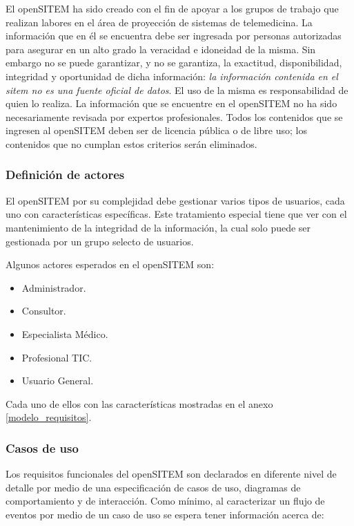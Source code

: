 El openSITEM ha sido creado con el fin de apoyar a los grupos de trabajo que realizan labores en el área de proyección de sistemas de telemedicina. La información que en él se encuentra debe ser ingresada por personas autorizadas para asegurar en un alto grado la veracidad e idoneidad de la misma. Sin embargo no se puede garantizar, y no se garantiza, la exactitud, disponibilidad, integridad y oportunidad de dicha información: \textit{la información contenida en el sitem no es una fuente oficial de datos}. El uso de la misma es responsabilidad de quien lo realiza. La información que se encuentre en el openSITEM no ha sido necesariamente revisada por expertos profesionales. Todos los contenidos que se ingresen al openSITEM deben ser de licencia pública o de libre uso; los contenidos que no cumplan estos criterios serán eliminados.

\subsubsection{Definición de actores}

El openSITEM por su complejidad debe gestionar varios tipos de usuarios, cada uno con características específicas. Este tratamiento especial tiene que ver con el mantenimiento de la integridad de la información, la cual solo puede ser gestionada por un grupo selecto de usuarios. 

Algunos actores esperados en el openSITEM son:

\begin{itemize}
\item Administrador.
\item Consultor.
\item Especialista Médico.
\item Profesional TIC.
\item Usuario General.
\end{itemize}

Cada uno de ellos con las características mostradas en el anexo \ref{modelo_requisitos}.

\subsubsection{Casos de uso}

Los requisitos funcionales del openSITEM son declarados en diferente nivel de detalle por medio de una especificación de casos de uso, diagramas de comportamiento y de interacción. Como mínimo, al caracterizar un flujo de eventos por medio de un caso de uso se espera tener información acerca de:

